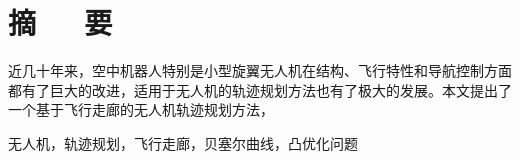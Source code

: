 \renewcommand{\baselinestretch}{1.25}
\fontsize{12pt}{15.6pt}\selectfont   %

\chapter*{\sSanhao \fHei 摘~~~要}

近几十年来，空中机器人特别是小型旋翼无人机在结构、飞行特性和导航控制方面都有了巨大的改进，适用于无人机的轨迹规划方法也有了极大的发展。本文提出了一个基于飞行走廊的无人机轨迹规划方法，

\vspace{19.5pt}
无人机，轨迹规划，飞行走廊，贝塞尔曲线，凸优化问题

\clearpage
\endinput
